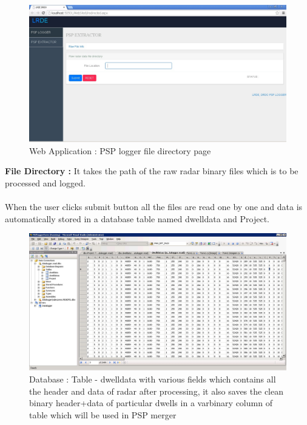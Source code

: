 \documentclass[14pt]{article} %
\begin{document}
   \begin{figure}[H]
    \centerline{\includegraphics[width=\linewidth]{DirectoryPage.jpg}}
  \caption{Web Application : PSP logger file directory page}
  \label{fig:figure 17}
\end{figure}  
  
\indent \textbf{File Directory :} It takes the path of the raw radar binary files which is to \indent be processed and logged.\\
\\When the user clicks submit button all the files are read one by one and data is automatically stored in a database table named dwelldata and Project.

 \begin{figure}[H]
    \centerline{\includegraphics[width=\linewidth]{database_table_data2.jpg}}
  \caption{Database : Table - dwelldata with various fields which contains all the header and data of radar after processing, it also saves the clean binary header+data of particular dwells in a varbinary column of table which will be used in PSP merger }
  \label{fig:figure 18}
\end{figure}  
  
\end{document}

